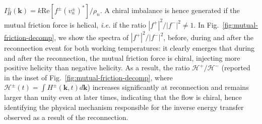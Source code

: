 \documentclass[%
 reprint,
 amsmath,amssymb,
 aps,
 prl,
]{revtex4-2}
\def \k{\mathbf{k}}
\begin{document}
{$I_H^\pm(\k) = k \mathrm{Re} [f^\pm (v_n^\pm)^*] /\rho_n$. A chiral imbalance is hence generated if the mutual friction force is helical, 
\textit{i.e.} if the ratio $|f^+|^2/|f^-|^2 \neq 1$. In Fig.~\ref{fig:mutual-friction-decomp}, we show the spectra of $|f^+|^2/|f^-|^2$, before, during and after 
the reconnection event for both working temperatures: it clearly emerges that during and after the reconnection, the mutual friction force is chiral,
injecting more positive helicity than negative helicity. As a result, the ratio $\mathcal{H}^+/\mathcal{H}^-$ 
(reported in the inset of Fig.~\ref{fig:mutual-friction-decomp}, where $\mathcal{H}^\pm (t) = \int\!\!H^\pm(\k,t)d\k$) 
increases significantly at reconnection and remains larger than unity even at later times, indicating that the flow is chiral, hence identifying the physical
mechanism responsible for the inverse energy transfer observed as a result of the reconnection. 


  

}
\end{document}
